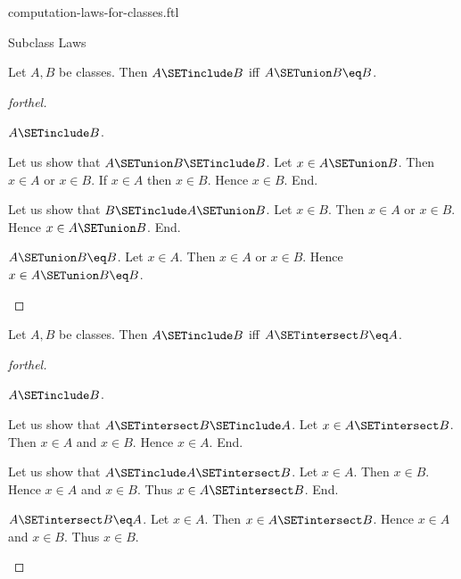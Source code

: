 \documentclass{naproche-library}
\begin{document}
\begin{smodule}[title=Computation Laws For Classes]{computation-laws-for-classes.ftl}
\begin{sfragment}{Subclass Laws}
  \begin{proposition}[forthel,id=FOUNDATIONS_02_6657236858306560]
    Let $A, B$ be classes.
    Then $A \SETinclude B$ iff $A \SETunion B \eq B$.
  \end{proposition}
  \begin{proof}[forthel]
    \begin{case}{$A \SETinclude B$.}

      Let us show that $A \SETunion B \SETinclude B$.
        Let $x \in A \SETunion B$.
        Then $x \in A$ or $x \in B$.
        If $x \in A$ then $x \in B$.
        Hence $x \in B$.
      End.

      Let us show that $B \SETinclude A \SETunion B$.
        Let $x \in B$.
        Then $x \in A$ or $x \in B$.
        Hence $x \in A \SETunion B$.
      End.
    \end{case}

    \begin{case}{$A \SETunion B \eq B$.}
      Let $x \in A$.
      Then $x \in A$ or $x \in B$.
      Hence $x \in A \SETunion B \eq B$.
    \end{case}
  \end{proof}

  \begin{proposition}[forthel,id=FOUNDATIONS_02_2356449346846720]
    Let $A, B$ be classes.
    Then $A \SETinclude B$ iff $A \SETintersect B \eq A$.
  \end{proposition}
  \begin{proof}[forthel]
    \begin{case}{$A \SETinclude B$.}

      Let us show that $A \SETintersect B \SETinclude A$.
        Let $x \in A \SETintersect B$.
        Then $x \in A$ and $x \in B$.
        Hence $x \in A$.
      End.

      Let us show that $A \SETinclude A \SETintersect B$.
        Let $x \in A$.
        Then $x \in B$.
        Hence $x \in A$ and $x \in B$.
        Thus $x \in A \SETintersect B$.
      End.
    \end{case}

    \begin{case}{$A \SETintersect B \eq A$.}
      Let $x \in A$.
      Then $x \in A \SETintersect B$.
      Hence $x \in A$ and $x \in B$.
      Thus $x \in B$.
    \end{case}
  \end{proof}
\end{sfragment}


\end{smodule}
\end{document}
